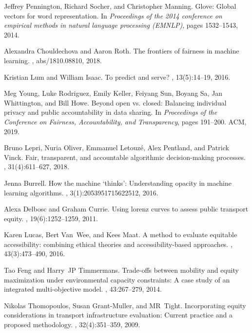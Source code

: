Jeffrey Pennington, Richard Socher, and Christopher Manning.
\newblock Glove: Global vectors for word representation.
\newblock In {\em Proceedings of the 2014 conference on empirical methods in
  natural language processing (EMNLP)}, pages 1532--1543, 2014.

Alexandra Chouldechova and Aaron Roth.
\newblock The frontiers of fairness in machine learning.
, abs/1810.08810, 2018.

Kristian Lum and William Isaac.
\newblock To predict and serve?
, 13(5):14--19, 2016.

Meg Young, Luke Rodriguez, Emily Keller, Feiyang Sun, Boyang Sa, Jan
  Whittington, and Bill Howe.
\newblock Beyond open vs. closed: Balancing individual privacy and public
  accountability in data sharing.
\newblock In {\em Proceedings of the Conference on Fairness, Accountability,
  and Transparency}, pages 191--200. ACM, 2019.

Bruno Lepri, Nuria Oliver, Emmanuel Letouz{\'e}, Alex Pentland, and Patrick
  Vinck.
\newblock Fair, transparent, and accountable algorithmic decision-making
  processes.
, 31(4):611--627, 2018.

Jenna Burrell.
\newblock How the machine ‘thinks’: Understanding opacity in machine
  learning algorithms.
, 3(1):2053951715622512, 2016.

Alexa Delbosc and Graham Currie.
\newblock Using lorenz curves to assess public transport equity.
, 19(6):1252--1259, 2011.

Karen Lucas, Bert Van~Wee, and Kees Maat.
\newblock A method to evaluate equitable accessibility: combining ethical
  theories and accessibility-based approaches.
, 43(3):473--490, 2016.

Tao Feng and Harry~JP Timmermans.
\newblock Trade-offs between mobility and equity maximization under
  environmental capacity constraints: A case study of an integrated
  multi-objective model.
,
  43:267--279, 2014.

Nikolas Thomopoulos, Susan Grant-Muller, and MR~Tight.
\newblock Incorporating equity considerations in transport infrastructure
  evaluation: Current practice and a proposed methodology.
, 32(4):351--359, 2009.

